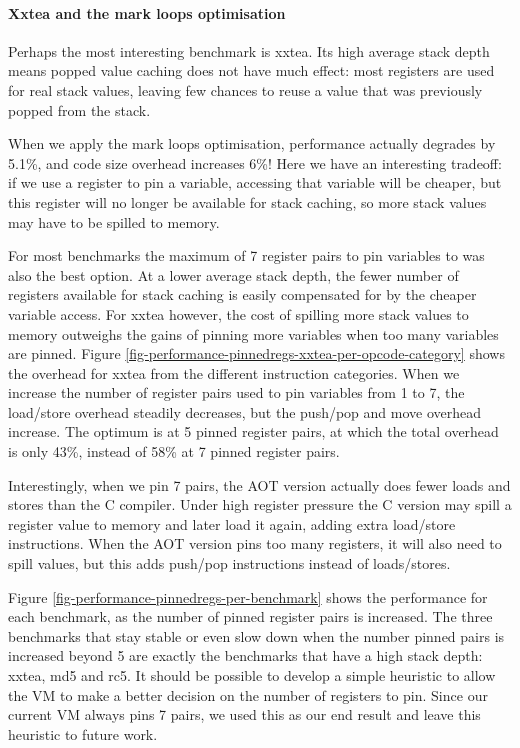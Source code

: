 \paragraph{Xxtea and the mark loops optimisation} Perhaps the most interesting benchmark is xxtea. Its high average stack depth means popped value caching does not have much effect: most registers are used for real stack values, leaving few chances to reuse a value that was previously popped from the stack. 

When we apply the mark loops optimisation, performance actually degrades by 5.1\%, and code size overhead increases 6\%! Here we have an interesting tradeoff: if we use a register to pin a variable, accessing that variable will be cheaper, but this register will no longer be available for stack caching, so more stack values may have to be spilled to memory.

For most benchmarks the maximum of 7 register pairs to pin variables to was also the best option. At a lower average stack depth, the fewer number of registers available for stack caching is easily compensated for by the cheaper variable access. For xxtea however, the cost of spilling more stack values to memory outweighs the gains of pinning more variables when too many variables are pinned. Figure \ref{fig-performance-pinnedregs-xxtea-per-opcode-category} shows the overhead for xxtea from the different instruction categories. When we increase the number of register pairs used to pin variables from 1 to 7, the load/store overhead steadily decreases, but the push/pop and move overhead increase. The optimum is at 5 pinned register pairs, at which the total overhead is only 43\%, instead of 58\% at 7 pinned register pairs.

 Interestingly, when we pin 7 pairs, the AOT version actually does fewer loads and stores than the C compiler. Under high register pressure the C version may spill a register value to memory and later load it again, adding extra load/store instructions. When the AOT version pins too many registers, it will also need to spill values, but this adds push/pop instructions instead of loads/stores.

Figure \ref{fig-performance-pinnedregs-per-benchmark} shows the performance for each benchmark, as the number of pinned register pairs is increased. The three benchmarks that stay stable or even slow down when the number pinned pairs is increased beyond 5 are exactly the benchmarks that have a high stack depth: xxtea, md5 and rc5. It should be possible to develop a simple heuristic to allow the VM to make a better decision on the number of registers to pin. Since our current VM always pins 7 pairs, we used this as our end result and leave this heuristic to future work.

